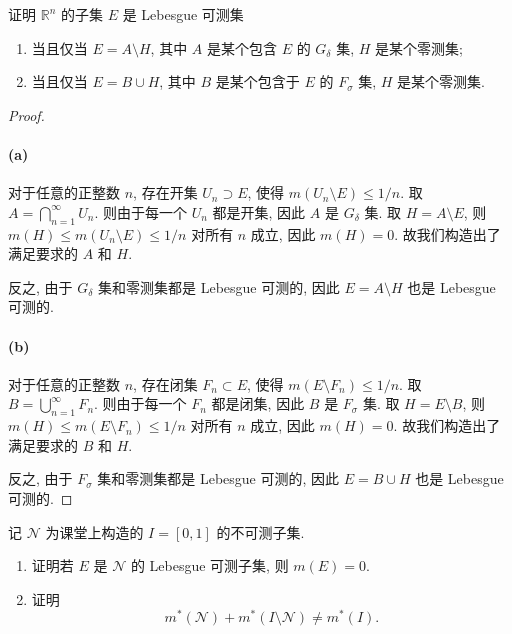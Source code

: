 \documentclass{article}
\begin{document}
\begin{problem}
  证明 $\mathbb{R}^n$ 的子集 $E$ 是 Lebesgue 可测集
  \begin{enumerate}
    \item[(a)] 当且仅当 $E=A\setminus H$, 其中 $A$ 是某个包含 $E$ 的 $G_\delta$ 集, $H$ 是某个零测集;
    \item[(b)] 当且仅当 $E=B\cup H$, 其中 $B$ 是某个包含于 $E$ 的 $F_\sigma$ 集, $H$ 是某个零测集.
  \end{enumerate}
\end{problem}

\begin{proof}
	\paragraph{(a)} 对于任意的正整数 $n$, 存在开集 $U_n \supset E$, 使得 $m(U_n \setminus E) \le 1/n$. 取 $A = \bigcap_{n=1}^{\infty} U_n$. 则由于每一个 $U_n$ 都是开集, 因此 $A$ 是 $G_\delta$ 集. 取 $H = A \setminus E$, 则 $m(H) \le m(U_n \setminus E) \le 1/n$ 对所有 $n$ 成立, 因此 $m(H) = 0$. 故我们构造出了满足要求的 $A$ 和 $H$.

	反之, 由于 $G_\delta$ 集和零测集都是 Lebesgue 可测的, 因此 $E = A \setminus H$ 也是 Lebesgue 可测的.

	\paragraph{(b)} 对于任意的正整数 $n$, 存在闭集 $F_n \subset E$, 使得 $m(E \setminus F_n) \le 1/n$. 取 $B = \bigcup_{n=1}^{\infty} F_n$. 则由于每一个 $F_n$ 都是闭集, 因此 $B$ 是 $F_\sigma$ 集. 取 $H = E \setminus B$, 则 $m(H) \le m(E \setminus F_n) \le 1/n$ 对所有 $n$ 成立, 因此 $m(H) = 0$. 故我们构造出了满足要求的 $B$ 和 $H$.

	反之, 由于 $F_\sigma$ 集和零测集都是 Lebesgue 可测的, 因此 $E = B \cup H$ 也是 Lebesgue 可测的.
\end{proof}



\begin{problem}
  记 $\mathcal{N}$ 为课堂上构造的 $I=[0,1]$ 的不可测子集.
  \begin{enumerate}
    \item[(a)] 证明若 $E$ 是 $\mathcal{N}$ 的 Lebesgue 可测子集, 则 $m(E)=0$.
    \item[(b)] 证明
      \[
        m^*(\mathcal{N})+m^*(I\setminus\mathcal{N})\neq m^*(I).
      \]
  \end{enumerate}
\end{problem}
\end{document}

